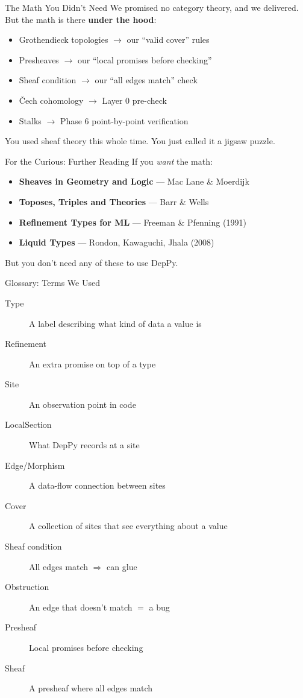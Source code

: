 \documentclass[aspectratio=169,10pt]{beamer}
\begin{document}
\begin{frame}{The Math You Didn't Need}
We promised no category theory, and we delivered.\\
But the math is there \textbf{under the hood}:
\vspace{0.3em}
\begin{itemize}
  \item Grothendieck topologies $\to$ our ``valid cover'' rules
  \item Presheaves $\to$ our ``local promises before checking''
  \item Sheaf condition $\to$ our ``all edges match'' check
  \item \v{C}ech cohomology $\to$ Layer 0 pre-check
  \item Stalks $\to$ Phase 6 point-by-point verification
\end{itemize}
\vspace{0.3em}
You used sheaf theory this whole time. You just called it a jigsaw puzzle.
\end{frame}

\begin{frame}{For the Curious: Further Reading}
If you \emph{want} the math:
\vspace{0.3em}
\begin{itemize}
  \item \textbf{Sheaves in Geometry and Logic} --- Mac Lane \& Moerdijk
  \item \textbf{Toposes, Triples and Theories} --- Barr \& Wells
  \item \textbf{Refinement Types for ML} --- Freeman \& Pfenning (1991)
  \item \textbf{Liquid Types} --- Rondon, Kawaguchi, Jhala (2008)
\end{itemize}
\vspace{0.3em}
But you don't need any of these to use DepPy.
\end{frame}

\begin{frame}{Glossary: Terms We Used}
{\small
\begin{description}
  \item[Type] A label describing what kind of data a value is
  \item[Refinement] An extra promise on top of a type
  \item[Site] An observation point in code
  \item[LocalSection] What DepPy records at a site
  \item[Edge/Morphism] A data-flow connection between sites
  \item[Cover] A collection of sites that see everything about a value
  \item[Sheaf condition] All edges match $\Rightarrow$ can glue
  \item[Obstruction] An edge that doesn't match $=$ a bug
  \item[Presheaf] Local promises before checking
  \item[Sheaf] A presheaf where all edges match
\end{description}}
\end{frame}
\end{document}
